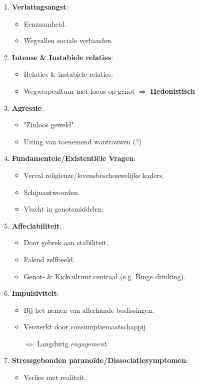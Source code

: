 \begin{enumerate}
	\item \textbf{Verlatingsangst}:
	\begin{itemize}
		\item Eenzaamheid.
		\item Wegvallen sociale verbanden.
	\end{itemize}
	\item\textbf{ Intense \& Instabiele relaties}:
	\begin{itemize}
		\item Relaties \& instabiele relaties.
		\item Wegwerpcultuur met focus op genot $\Rightarrow$ \textbf{Hedonistisch}
	\end{itemize}
	\item \textbf{Agressie}:
	\begin{itemize}
		\item "Zinloos geweld"
		\item Uiting van toenemend wantrouwen (?)
	\end{itemize}
	\item \textbf{Fundamentele/Existenti\"ele Vragen}:
	\begin{itemize}
		\item Verval religieuze/levensbeschouwelijke kaders.
		\item Schijnantwoorden.
		\item Vlucht in genotsmiddelen.
	\end{itemize}
	\item \textbf{Affeclabiliteit}:
	\begin{itemize}
		\item Door gebrek aan stabiliteit.
		\item Falend zelfbeeld.
		\item Genot- \& Kickcultuur centraal (e.g. Binge drinking).
	\end{itemize}
	\item \textbf{Impulsiviteit}:
	\begin{itemize}
		\item Bij het nemen van allerhande beslissingen.
		\item Versterkt door consumptiemaatschappij.
		\item[$\Leftrightarrow$] Langdurig \textit{engagement}.
	\end{itemize}
	\item \textbf{Stressgebonden parano\"ide/Dissociatiesymptomen}:
	\begin{itemize}
		\item Verlies met realiteit.

\end{itemize}
\end{enumerate}
